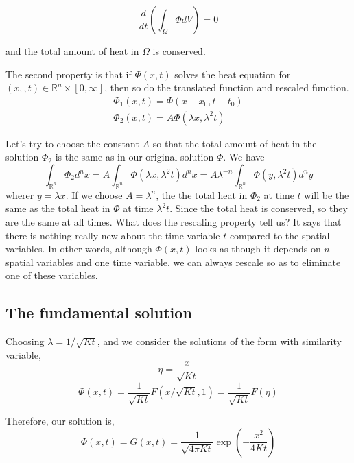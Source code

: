 \documentclass{article}
\theoremstyle{definition}
\begin{document}
\begin{equation}
\frac{d}{dt}\left(\int_{\Omega} \Phi dV\right)=0
\end{equation}


and the total amount of heat in $\Omega$ is conserved.



The second property is that if $\Phi(x,t)$ solves the heat equation for $(x,,t) \in \mathbb{R}^n \times [0,\infty]$, then so do the translated function and rescaled function.
\begin{align}
\Phi_1(x,t)=\Phi(x-x_0,t-t_0)\\
\Phi_2(x,t)=A\Phi(\lambda x,\lambda ^2t)
\end{align}



Let's try to choose the constant $A$ so that the total amount of heat in the solution $\Phi_2$ is the same as in our original solution $\Phi$. We have
\begin{equation}
\int_{\mathbb{R}^n} \Phi_2 d^nx=A\int_{\mathbb{R}^n}\Phi(\lambda x, \lambda^2 t) d^n x=A\lambda ^{-n}\int_{\mathbb{R}^n}\Phi(y,\lambda^2 t)d^n y
\end{equation}
wherer $y=\lambda x$. If we choose $A=\lambda ^n$, the the total heat in $\Phi_2$ at time $t$ will be the same as the total heat in $\Phi$ at time $\lambda^2 t$. Since the total heat is conserved, so they are the same at all times. What does the rescaling property tell us? It says that there is nothing really new about the time variable $t$ compared to the spatial variables.
 In other words, although $\Phi(x,t)$ looks as though it depends on $n$ spatial variables and one time variable, we can always rescale so as to eliminate one of these variables. 

\subsection{The fundamental solution}
Choosing $\lambda=1/\sqrt{Kt}$, and we consider the solutions of the form with similarity variable,
\begin{equation}
\eta=\frac{x}{\sqrt{Kt}}
\end{equation}
\begin{equation}
\Phi(x,t)=\frac{1}{\sqrt{Kt}}F(x/\sqrt{Kt},1)=\frac{1}{\sqrt{Kt}}F(\eta)
\end{equation}

Therefore, our solution is,
\begin{equation}
\Phi(x,t)=G(x,t)=\frac{1}{\sqrt{4\pi Kt}}\exp\left(-\frac{x^2}{4Kt}\right)
\end{equation}
\end{document}
